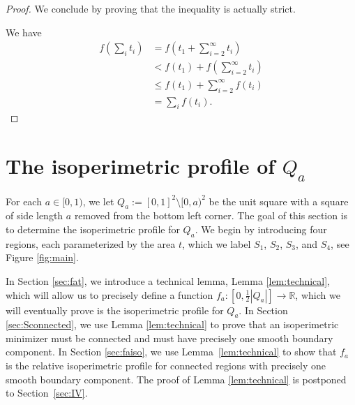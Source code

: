 \documentclass[leqno]{article}
\numberwithin{equation}{section}
\theoremstyle{definition}
\theoremstyle{remark}
\theoremstyle{plain}
\begin{document}
\begin{proof}
We conclude by proving that the inequality is actually strict.

We have \begin{align*} f \left(\sum_i t_i\right) &= f\left(t_1 + \sum_{i=2}^\infty t_i\right)\\ &< f(t_1) + f\left(\sum_{i=2}^\infty t_i\right)\\ &\leq f(t_1) + \sum_{i=2}^\infty f(t_i)\\ &= \sum_i f(t_i).\end{align*}

\end{proof}
\fi

\section{\texorpdfstring{The isoperimetric profile of $Q_a$}{The isoperimetric profile of Qa}}\label{sec:allconnected}

For each $a\in [0,1)$, we let $Q_a := [0,1]^2 \setminus [0,a)^2$ be the unit square with a square of side length $a$ removed from the bottom left corner.  The goal of this section is to determine the isoperimetric profile for $Q_a$.  We begin by introducing four regions, each parameterized by the area $t$, which we label $S_1$, $S_2$, $S_3$, and $S_4$, see Figure \ref{fig:main}.

In Section \ref{sec:fat}, we introduce a technical lemma, Lemma \ref{lem:technical}, which will allow us to precisely define a function $f_a:[0,\tfrac{1}{2}|Q_a|]\rightarrow \mathbb{R}$, which we will eventually prove is the isoperimetric profile for $Q_a$.  In Section \ref{sec:Sconnected}, we use Lemma \ref{lem:technical} to prove that an isoperimetric minimizer must be connected and must have precisely one smooth boundary component. In Section \ref{sec:faiso}, we use Lemma~\ref{lem:technical} to show that $f_a$ is the relative isoperimetric profile for connected regions with precisely one smooth boundary component.  The proof of Lemma \ref{lem:technical} is postponed to Section~\ref{sec:IV}.
\end{document}
